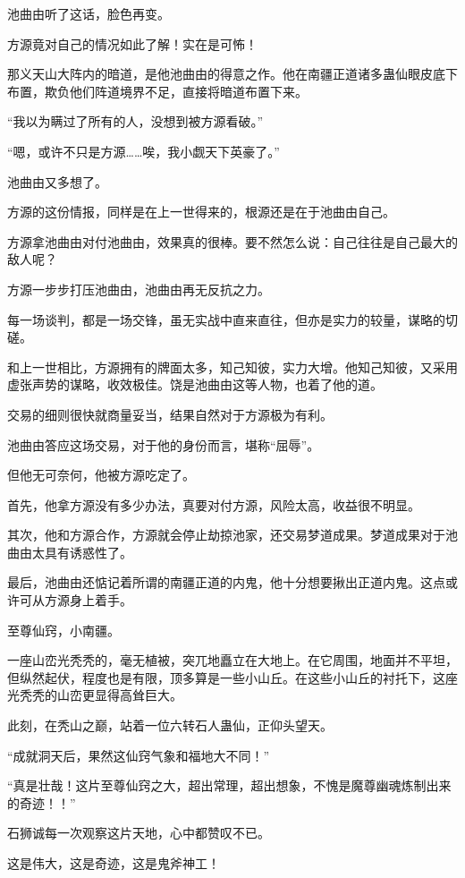 \begin{this_body}
池曲由听了这话，脸色再变。

方源竟对自己的情况如此了解！实在是可怖！

那义天山大阵内的暗道，是他池曲由的得意之作。他在南疆正道诸多蛊仙眼皮底下布置，欺负他们阵道境界不足，直接将暗道布置下来。

“我以为瞒过了所有的人，没想到被方源看破。”

“嗯，或许不只是方源……唉，我小觑天下英豪了。”

池曲由又多想了。

方源的这份情报，同样是在上一世得来的，根源还是在于池曲由自己。

方源拿池曲由对付池曲由，效果真的很棒。要不然怎么说：自己往往是自己最大的敌人呢？

方源一步步打压池曲由，池曲由再无反抗之力。

每一场谈判，都是一场交锋，虽无实战中直来直往，但亦是实力的较量，谋略的切磋。

和上一世相比，方源拥有的牌面太多，知己知彼，实力大增。他知己知彼，又采用虚张声势的谋略，收效极佳。饶是池曲由这等人物，也着了他的道。

交易的细则很快就商量妥当，结果自然对于方源极为有利。

池曲由答应这场交易，对于他的身份而言，堪称“屈辱”。

但他无可奈何，他被方源吃定了。

首先，他拿方源没有多少办法，真要对付方源，风险太高，收益很不明显。

其次，他和方源合作，方源就会停止劫掠池家，还交易梦道成果。梦道成果对于池曲由太具有诱惑性了。

最后，池曲由还惦记着所谓的南疆正道的内鬼，他十分想要揪出正道内鬼。这点或许可从方源身上着手。

至尊仙窍，小南疆。

一座山峦光秃秃的，毫无植被，突兀地矗立在大地上。在它周围，地面并不平坦，但纵然起伏，程度也是有限，顶多算是一些小山丘。在这些小山丘的衬托下，这座光秃秃的山峦更显得高耸巨大。

此刻，在秃山之巅，站着一位六转石人蛊仙，正仰头望天。

“成就洞天后，果然这仙窍气象和福地大不同！”

“真是壮哉！这片至尊仙窍之大，超出常理，超出想象，不愧是魔尊幽魂炼制出来的奇迹！！”

石狮诚每一次观察这片天地，心中都赞叹不已。

这是伟大，这是奇迹，这是鬼斧神工！


\end{this_body}

